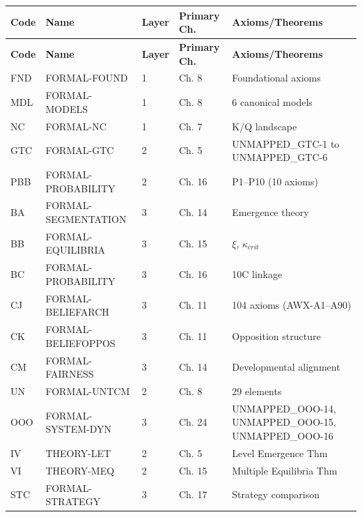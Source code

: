 \begin{tcolorbox}[colback=green!3!white, colframe=green!60!black,
    title=\textbf{All 17 FORMAL Appendices}]

\small
\begin{longtable}{|l|l|l|l|l|}
\hline
\textbf{Code} & \textbf{Name} & \textbf{Layer} & \textbf{Primary Ch.} & \textbf{Axioms/Theorems} \\
\hline
\hline
\endfirsthead
\hline
\textbf{Code} & \textbf{Name} & \textbf{Layer} & \textbf{Primary Ch.} & \textbf{Axioms/Theorems} \\
\hline
\endhead
FND & FORMAL-FOUND & 1 & Ch. 8 & Foundational axioms \\
MDL & FORMAL-MODELS & 1 & Ch. 8 & 6 canonical models \\
NC & FORMAL-NC & 1 & Ch. 7 & K/Q landscape \\
\hline
GTC & FORMAL-GTC & 2 & Ch. 5 & UNMAPPED_GTC-1 to UNMAPPED_GTC-6 \\
PBB & FORMAL-PROBABILITY & 2 & Ch. 16 & P1--P10 (10 axioms) \\
\hline
BA & FORMAL-SEGMENTATION & 3 & Ch. 14 & Emergence theory \\
BB & FORMAL-EQUILIBRIA & 3 & Ch. 15 & $\xi$, $\kappa_{crit}$ \\
BC & FORMAL-PROBABILITY & 3 & Ch. 16 & 10C linkage \\
\hline
CJ & FORMAL-BELIEFARCH & 3 & Ch. 11 & 104 axioms (AWX-A1--A90) \\
CK & FORMAL-BELIEFOPPOS & 3 & Ch. 11 & Opposition structure \\
CM & FORMAL-FAIRNESS & 3 & Ch. 14 & Developmental alignment \\
\hline
UN & FORMAL-UNTCM & 2 & Ch. 8 & 29 elements \\
OOO & FORMAL-SYSTEM-DYN & 3 & Ch. 24 & UNMAPPED_OOO-14, UNMAPPED_OOO-15, UNMAPPED_OOO-16 \\
\hline
IV & THEORY-LET & 2 & Ch. 5 & Level Emergence Thm \\
VI & THEORY-MEQ & 2 & Ch. 15 & Multiple Equilibria Thm \\
STC & FORMAL-STRATEGY & 3 & Ch. 17 & Strategy comparison \\
\hline
\end{longtable}

\end{tcolorbox}

